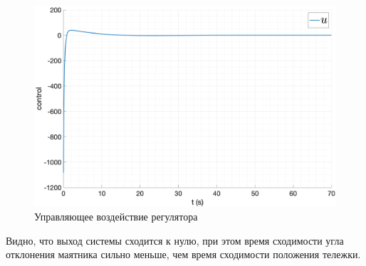 \begin{figure}[ht!]
    \centering
    \includegraphics[width=\textwidth]{media/plots/LQR/u_1.png}
    \caption{Управляющее воздействие регулятора}
    \label{fig:lqr_controller_u}
\end{figure}
Видно, что выход системы сходится к нулю, при этом время сходимости угла отклонения маятника сильно 
меньше, чем время сходимости положения тележки. 

